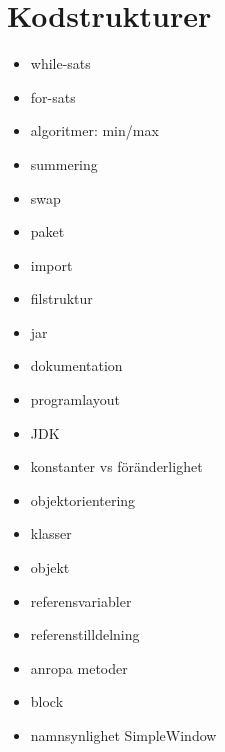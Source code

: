 \chapter{Kodstrukturer}
\begin{itemize}[nosep]
\item while-sats
\item for-sats
\item algoritmer: min/max
\item summering
\item swap
\item paket
\item import
\item filstruktur
\item jar
\item dokumentation
\item programlayout
\item JDK
\item konstanter vs föränderlighet
\item objektorientering
\item klasser
\item objekt
\item referensvariabler
\item referenstilldelning
\item anropa metoder
\item block
\item namnsynlighet SimpleWindow\end{itemize}